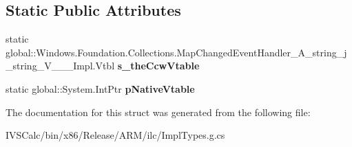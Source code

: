 \subsection*{Static Public Attributes}
\begin{DoxyCompactItemize}
\item 
\mbox{\label{struct_windows_1_1_foundation_1_1_collections_1_1_map_changed_event_handler___a__string__j__string___v_______impl_1_1_vtbl_a5d64e8c50404cec4819e2320025396d6}} 
static global\+::\+Windows.\+Foundation.\+Collections.\+Map\+Changed\+Event\+Handler\+\_\+\+A\+\_\+string\+\_\+j\+\_\+string\+\_\+\+V\+\_\+\+\_\+\+\_\+\+Impl.\+Vtbl {\bfseries s\+\_\+the\+Ccw\+Vtable}
\item 
\mbox{\label{struct_windows_1_1_foundation_1_1_collections_1_1_map_changed_event_handler___a__string__j__string___v_______impl_1_1_vtbl_ae660778db8d995cccbff15eb6fa115d7}} 
static global\+::\+System.\+Int\+Ptr {\bfseries p\+Native\+Vtable}
\end{DoxyCompactItemize}


The documentation for this struct was generated from the following file\+:\begin{DoxyCompactItemize}
\item 
I\+V\+S\+Calc/bin/x86/\+Release/\+A\+R\+M/ilc/Impl\+Types.\+g.\+cs\end{DoxyCompactItemize}
